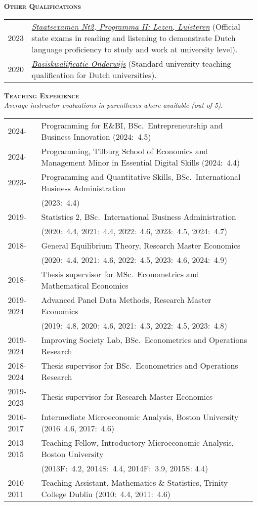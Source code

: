 \documentclass[11pt,overlapped,line,letterpaper]{article}
\newcommand{\cvsec}[1]{\vspace{\baselineskip}\textbf{\textsc{#1}}}
\begin{document}
\cvsec{Other Qualifications}\smallskip \\
\begin{tabularx}{\textwidth}{lX}
  2023 & \href{https://www.staatsexamensnt2.nl/English}{\emph{Staatsexamen Nt2, Programma II: Lezen, Luisteren}} (Official state exams in reading and listening to demonstrate Dutch language proficiency to study and work at university level). \\
  2020 & \href{https://www.universiteitenvannederland.nl/en_GB/utq}{\emph{Basiskwalificatie Onderwijs}} (Standard university teaching qualification for Dutch universities).
\end{tabularx}

\newpage
\cvsec{Teaching Experience}\smallskip \\
\emph{Average instructor evaluations in parentheses where available (out of 5).}\\
\begin{tabularx}{\textwidth}{lX}
  2024- & Programming for E\&BI, BSc.~Entrepreneurship and Business Innovation (2024:~4.5)\\
  2024- & Programming, Tilburg School of Economics and Management Minor in Essential Digital Skills (2024:~4.4)\\
  2023- & Programming and Quantitative Skills, BSc.~International Business Administration \\&(2023:~4.4)\\
  2019- & Statistics 2, BSc.~International Business Administration \\&(2020:~4.4, 2021:~4.4, 2022:~4.6, 2023:~4.5, 2024:~4.7)\\
    2018- & General Equilibrium Theory, Research Master Economics \\&(2020:~4.4, 2021:~4.6, 2022:~4.5, 2023:~4.6, 2024:~4.9)\\
  2018- & Thesis supervisor for MSc.~Econometrics and Mathematical Economics \\
  2019-2024 & Advanced Panel Data Methods, Research Master Economics \\ &
  (2019:~4.8, 2020:~4.6, 2021:~4.3, 2022:~4.5, 2023:~4.8)\\
  2019-2024 & Improving Society Lab, BSc.~Econometrics and Operations Research\\
  2018-2024 & Thesis supervisor for BSc.~Econometrics and Operations Research \\
  2019-2023 & Thesis supervisor for Research Master Economics \\
  2016-2017 & Intermediate Microeconomic Analysis, Boston University (2016~4.6, 2017:~4.6)  \\
  2013-2015 & Teaching Fellow, Introductory Microeconomic Analysis, Boston University \\&(2013F:~4.2, 2014S:~4.4, 2014F:~3.9, 2015S: 4.4)\\
  2010-2011 & Teaching Assistant, Mathematics \& Statistics, Trinity College Dublin (2010:~4.4, 2011:~4.6)\\
\end{tabularx}
\end{document}
